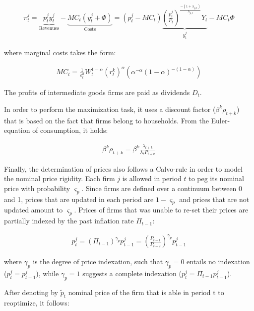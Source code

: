 \documentclass{pracamgr}
\numberwithin{equation}{section}
\begin{document}
\begin{align} \label{Nominal profits}
\pi_{t}^{j} = \underbrace{p_{t}^{j} y_{t}^{j}}_\text{Revenues} - \underbrace{MC_{t} \left(y_{t}^{j} + \Phi \right)}_\text{Costs} = \left(p_{t}^{j} - MC_{t} \right) \underbrace{\left( \frac{p_{t}^{j}}{P_{t}} \right)^{\frac{-(1+\lambda_{p,t})}{\lambda_{p,t}}} Y_{t}}_{y_{t}^{j}} - MC_{t}\Phi
\end{align}

where marginal costs takes the form:

\begin{align}
MC_{t} = \frac{1}{\varepsilon_{t}^{a}} W_{t}^{1-\alpha} \left(r_{t}^{k} \right)^{\alpha} \left( \alpha^{-\alpha} (1-\alpha)^{-(1-\alpha)}\right)
\end{align}

The profits of intermediate goods firms are paid as dividends $D_{t}$.

In order to perform the maximization task, it uses a discount factor ($\beta^{k} \rho_{t +k}$) that is based on the fact that firms belong to households. From the Euler-equation of consumption, it holds:

{\color{red} 
\begin{align} \label{Euler for firm}
\beta^{k} \rho_{t +k} = \beta^{k} \frac{\lambda_{t+k}}{\lambda_{t}P_{t+k}}
\end{align} }

Finally, the determination of prices also follows a Calvo-rule in order to model the nominal price rigidity. Each firm $j$ is allowed in period $t$ to peg its nominal price with probability $\varsigma_{p}$. Since firms are defined over a continuum between 0 and 1, prices that are updated in each period are $1-\varsigma_{p}$ and prices that are not updated amount to $\varsigma_{p}$. Prices of firms that was unable to re-set their prices are partially indexed by the past inflation rate $\Pi_{t-1}$:

\begin{align}
p_{t}^{j} = \left( \Pi_{t-1} \right)^{\gamma_{p}}p_{t-1}^{j} = \left( \frac{P_{t-1}}{P_{t-2}} \right)^{\gamma_{p}}p_{t-1}^{j}
\end{align}

where $\gamma_{p}$ is the degree of price indexation, such that $\gamma_{p} = 0$ entails no indexation ($p_{t}^{j} = p_{t-1}^{j}$), while $\gamma_{p} = 1$ suggests a complete indexation ($p_{t}^{j} = \Pi_{t-1} p_{t-1}^{j}$).

After denoting by $\widetilde{p}_{t}$ nominal price of the firm that is able in period t to reoptimize, it follows:
\end{document}

